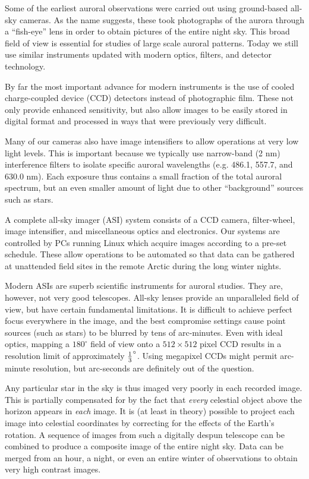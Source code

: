 \documentclass[11pt,twoside]{article}   %
\begin{document}
\begin{multicols}{2}
Some of the earliest auroral observations were carried out using
ground-based all-sky cameras.  As the name suggests, these took
photographs of the aurora through a ``fish-eye'' lens in order to
obtain pictures of the entire night sky.  This broad field of view
is essential for studies of large scale auroral patterns.  Today
we still use similar instruments updated with modern optics,
filters, and detector technology.

By far the most important advance for modern instruments is the
use of cooled charge-coupled device (CCD) detectors instead of
photographic film.  These not only provide enhanced sensitivity,
but also allow images to be easily stored in digital format and
processed in ways that were previously very difficult.

Many of our cameras also have image intensifiers to allow
operations at very low light levels.  This is important because we
typically use narrow-band (2 nm) interference filters to isolate
specific auroral wavelengths (e.g. 486.1, 557.7, and 630.0 nm).
Each exposure thus contains a small fraction of the total auroral
spectrum, but an even smaller amount of light due to other
``background'' sources such as stars.

A complete all-sky imager (ASI) system consists of a CCD camera,
filter-wheel, image intensifier, and miscellaneous optics and
electronics.  Our systems are controlled by PCs running Linux
which acquire images according to a pre-set schedule. These allow
operations to be automated so that data can be gathered at
unattended field sites in the remote Arctic during the long winter
nights.

Modern ASIs are superb scientific instruments for auroral studies.
They are, however, not very good telescopes.  All-sky lenses
provide an unparalleled field of view, but have certain
fundamental limitations.  It is difficult to achieve perfect focus
everywhere in the image, and the best compromise settings cause
point sources (such as stars) to be blurred by tens of
arc-minutes. Even with ideal optics, mapping a $180^\circ$ field
of view onto a $512{\times}512$ pixel CCD results in a resolution
limit of approximately ${1 \over 3}^\circ$. Using megapixel CCDs
might permit arc-minute resolution, but arc-seconds are definitely
out of the question.

Any particular star in the sky is thus imaged very poorly in each
recorded image.  This is partially compensated for by the fact
that \emph{every} celestial object above the horizon appears in
\emph{each} image.  It is (at least in theory) possible to project
each image into celestial coordinates by correcting for the
effects of the Earth's rotation. A sequence of images from such a
digitally despun telescope can be combined to produce a composite
image of the entire night sky. Data can be merged from an hour, a
night, or even an entire winter of observations to obtain very
high contrast images.


\end{multicols}
\end{document}
